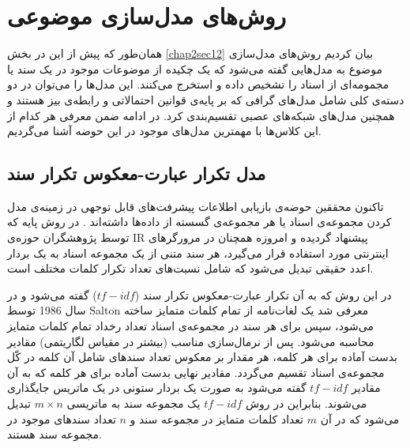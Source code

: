 \section{روش‌های مدل‌سازی موضوعی}
\label{chap3sec3}
همان‌طور که پیش از این در بخش
\ref{chap2sec12}
بیان کردیم روش‌های مدل‌سازی موضوع به مدل‌هایی گفته می‌‌شود که یک چکیده از موضوعات موجود در یک سند یا مجمومه‌ای از اسناد را تشخیص داده و استخرج می‌‌کنند. این مدل‌ها را می‌‌توان در دو دسته‌ی کلی‌ شامل مدل‌های گرافی که بر پایه‌ی قوانین احتمالاتی و رابطه‌‌ی بیز هستند و همچنین مدل‌های شبکه‌های عصبی تقسیم‌بندی کرد. در ادامه ضمن معرفی هر کدام از این کلاس‌ها با مهمترین مدل‌های موجود در این حوضه آشنا می‌‌گردیم.
	\subsection{مدل تکرار عبارت-معکوس تکرار سند}
	\label{chap3sec3sub1}
	 تاکنون محققین حوضه‌ی بازیابی اطلاعات پیشرفت‌های قابل توجهی‌ در زمینه‌ی مدل کردن مجموعه‌ی اسناد یا هر مجموعه‌ی گسسته‌ از داده‌ها داشته‌اند
	\cite{baeza1999modern}.
	در روش پایه که توسط پژوهشگران حوزه‌ی
	IR
	پیشنهاد گردیده و امروزه همچنان در مرورگر‌های اینترنتی مورد استفاده قرار می‌‌گیرد، هر سند متنی از یک مجموعه اسناد به یک بردار اعدد حقیقی‌ تبدیل می‌شود که شامل نسبت‌های تعداد تکرار کلمات مختلف است.
	
	 در این روش که به آن تکرار عبارت-معکوس تکرار سند 
	($tf-idf$) \cite{salton1986introduction}
	گفته می‌شود و در سال 1986 توسط
	Salton
	معرفی شد یک لغات‌نامه از تمام کلمات متمایز ساخته می‌‌شود، سپس برای هر سند در مجموعه‌ی اسناد تعداد رخداد تمام کلمات متمایز محاسبه می‌‌شود. پس از نرمال‌سازی مناسب (بیشتر در مقیاس لگاریتمی) مقادیر بدست آماده برای هر کلمه، هر مقدار بر معکوس تعداد سندهای شامل آن کلمه در کّل مجموعه‌ی اسناد تقسیم می‌‌گردد. مقادیر نهایی بدست آماده برای هر کلمه که به آن مقادیر
	$tf-idf$
	گفته می‌شود به صورت یک بردار ستونی در یک ماتریس جایگذاری می‌شوند. بنابراین در روش
	$tf-idf$
	یک مجموعه سند به ماتریسی
	$m \times n$
	تبدیل می‌شود که در آن
	$m$
	تعداد کلمات متمایز در مجموعه سند و
	$n$
	تعداد سندهای موجود در مجموعه سند هستند.
	
